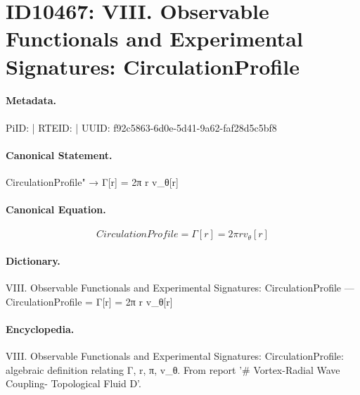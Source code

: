 \section*{ID10467: VIII. Observable Functionals and Experimental Signatures: CirculationProfile}
\paragraph{Metadata.}
PiID:  | RTEID:  | UUID: f92c5863-6d0e-5d41-9a62-faf28d5c5bf8

\paragraph{Canonical Statement.}
CirculationProfile" → Γ[r] = 2π r v\_θ[r]

\paragraph{Canonical Equation.}
\[
CirculationProfile = Γ[r] = 2π r v_θ[r]
\]

\paragraph{Dictionary.}
VIII. Observable Functionals and Experimental Signatures: CirculationProfile — CirculationProfile = Γ[r] = 2π r v\_θ[r]

\paragraph{Encyclopedia.}
VIII. Observable Functionals and Experimental Signatures: CirculationProfile: algebraic definition relating Γ, r, π, v\_θ. From report '\# Vortex-Radial Wave Coupling- Topological Fluid D'.
